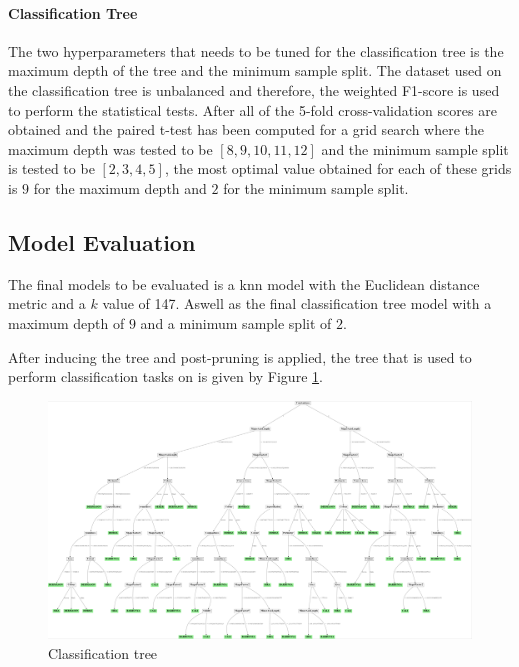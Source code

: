 \documentclass[10pt, conference]{IEEEtran}
\begin{document}
\paragraph{Classification Tree}

The two hyperparameters that needs to be tuned for the classification tree is the maximum depth of the tree and the minimum sample split.
The dataset used on the classification tree is unbalanced and therefore, the weighted F1-score is used to perform the statistical tests.
After all of the 5-fold cross-validation scores are obtained and the paired t-test has been computed for a grid search where the maximum depth
was tested to be $[8,9,10,11,12]$ and the minimum sample split is tested to be $[2,3,4,5]$, the most optimal value obtained for each of these
grids is $9$ for the maximum depth and $2$ for the minimum sample split.

\subsection{Model Evaluation}

The final models to be evaluated is a \acrshort{knn} model with the Euclidean distance metric and a $k$ value of 147. Aswell
as the final classification tree model with a maximum depth of $9$ and a minimum sample split of $2$.

After inducing the tree and post-pruning is applied, the tree that is used to perform classification tasks on is given
by Figure \ref{CT_plot}.

\begin{figure}[h!]
    \centerline{\includegraphics[scale=0.33]{../Plots/Classification tree.png}}
    \caption{Classification tree}
    \label{CT_plot}
\end{figure}
\end{document}
